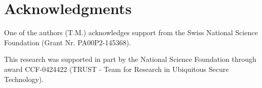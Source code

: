 \documentclass{sigchi}
\begin{document}
\section{Acknowledgments}
One of the authors (T.M.) acknowledges support from the Swiss National Science Foundation (Grant Nr.  PA00P2-145368).

This research was supported in part by the National Science Foundation through award CCF-0424422 (TRUST - Team for Research in Ubiquitous Secure Technology).

%
%
%
%
%

\balance



\end{document}

